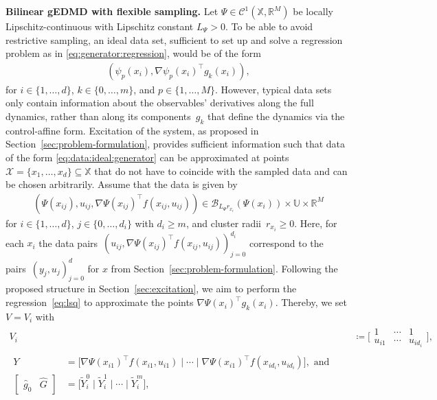 \documentclass[a4paper, reqno]{amsart}
\newcommand{\R}{\ensuremath{\mathbb R}}
\begin{document}
\textbf{Bilinear gEDMD with flexible sampling.}
Let $\Psi \in \mathcal{C}^1(\mathbb{X}, \R^M)$ be locally Lipschitz-continuous with Lipschitz constant $L_\Psi > 0$. To be able to avoid restrictive sampling, an ideal data set, sufficient to set up and solve a regression problem as in \eqref{eq:generator:regression}, would be of the form
\begin{align}\label{eq:data:ideal:generator} 
    (\psi_p(x_i), \nabla\psi_p(x_{i})^\top g_k(x_i)) , %
\end{align}
for $i \in \{1,\ldots,d\}$, $k \in \{0,\ldots,m\}$, and $p \in \{1, \dots, M\}$. 
 However, typical data sets only contain information about the observables' derivatives along the full dynamics, rather than along its components~$g_k$ that define the dynamics via the control-affine form. 
 Excitation of the system, as proposed in  Section~\ref{sec:problem-formulation}, provides sufficient information such that data of the form \eqref{eq:data:ideal:generator} can be approximated at points~$\mathcal{X} = \{x_1, \dots, x_d\} \subseteq \mathbb{X}$ that do not have to coincide with the sampled data and can be chosen arbitrarily. 
 Assume that the data is given by 
\begin{align}\label{eq:data:clustered}
    (\Psi(x_{ij}),u_{ij},\nabla\Psi(x_{ij})^\top f(x_{ij},u_{ij})) \in \mathcal{B}_{L_\Psi r_{x_i}}(\Psi(x_i)) \times \mathbb{U} \times \mathbb{R}^M
\end{align} 
for $i\in \{1, \dots, d\}$, $j \in \{0, \dots, d_i\}$ with $d_i \geq m$, and cluster radii~$r_{x_i} \geq 0$. 
Here, for each $x_i$ the data pairs~$(u_{ij},\nabla\Psi(x_{ij})^\top f(x_{ij},u_{ij}))_{j = 0}^{d_i}$ correspond to the pairs~$(y_j, u_j)_{j = 0}^d$ for $x$ from Section~\ref{sec:problem-formulation}. Following the proposed structure in Section~\ref{sec:excitation}, we aim to perform the regression~\eqref{eq:lsq} to approximate the points $\nabla\Psi(x_i)^\top g_k(x_i)$. Thereby, we set $V = V_i$ with 
\begin{align}\label{eq:g:V}
    V_i &\coloneqq \Bigg[\begin{array}{c|c|c}
         1 & \cdots & 1  \\
         u_{i1} & \cdots & u_{id_i}
    \end{array}\Bigg], \\
\begin{split}\label{eq:g:YV}
    Y &= \Big[\nabla\Psi(x_{i1})^\top f({x}_{i1}, u_{i1}) \mid  \cdots \mid \nabla\Psi(x_{i1})^\top f({x}_{id_i}, u_{id_i})\Big], 
    \text{ and } \quad \\
    \begin{bmatrix}
    \hat{g}_0 & \hat{G}
\end{bmatrix} &= \Big[ \tilde{Y}^0_i \mid \tilde{Y}^1_i \mid \cdots \mid \tilde{Y}^m_i \Big],
\end{split} 
\end{align}
\end{document}
